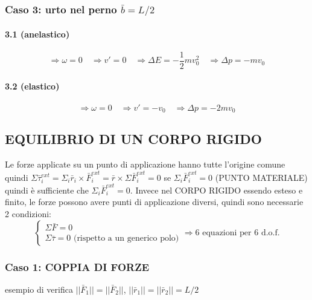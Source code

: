 \subsubsection*{Caso 3: urto nel perno $\bar{b} = L/2$}
\paragraph*{3.1 (anelastico)}
$$ \Rightarrow \omega = 0 \quad \Rightarrow v' = 0 \quad \Rightarrow \Delta E = - \frac{1}{2} m v_0^2 \quad \Rightarrow \Delta p = - m v_0 $$

\paragraph*{3.2 (elastico)}
$$ \Rightarrow \omega = 0 \quad \Rightarrow v' = -v_0 \quad \Rightarrow \Delta p = -2 m v_0 $$

\subsection*{EQUILIBRIO DI UN CORPO RIGIDO}
Le forze applicate su un punto di applicazione hanno tutte l'origine comune quindi $\Sigma \bar{\tau}_i^{ext} = \Sigma_i \bar{r}_i \times \bar{F}_i^{ext} = \bar{r} \times \Sigma \bar{F}_i^{ext} = 0$ se $\Sigma_i \bar{F}_i^{ext} = 0$ (PUNTO MATERIALE) quindi è sufficiente che $\Sigma_i \bar{F}_i^{ext} = 0$. Invece nel CORPO RIGIDO essendo esteso e finito, le forze possono avere punti di applicazione diversi, quindi sono necessarie 2 condizioni:
$$ \begin{cases}
\Sigma \bar{F} = 0 \\
\Sigma \bar{\tau} = 0 \text{ (rispetto a un generico polo)}
\end{cases} \Rightarrow 6 \text{ equazioni per } 6 \text{ d.o.f.} $$

\subsubsection*{Caso 1: COPPIA DI FORZE}
esempio di verifica
$||\bar{F}_1|| = ||\bar{F}_2||$, $||\bar{r}_1|| = ||\bar{r}_2|| = L/2$

\begin{figure}[H]
\raggedleft
{}
\end{figure}

